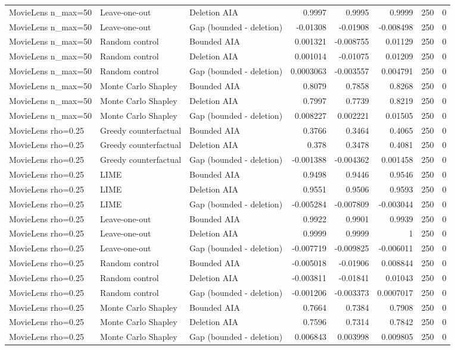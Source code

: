 \begin{table}[t]
{\begin{tabular}{lllrrrrr}
MovieLens n\_max=50 & Leave-one-out & Deletion AIA & 0.9997 & 0.9995 & 0.9999 & 250 & 0 \\
MovieLens n\_max=50 & Leave-one-out & Gap (bounded - deletion) & -0.01308 & -0.01908 & -0.008498 & 250 & 0 \\
MovieLens n\_max=50 & Random control & Bounded AIA & 0.001321 & -0.008755 & 0.01129 & 250 & 0 \\
MovieLens n\_max=50 & Random control & Deletion AIA & 0.001014 & -0.01075 & 0.01209 & 250 & 0 \\
MovieLens n\_max=50 & Random control & Gap (bounded - deletion) & 0.0003063 & -0.003557 & 0.004791 & 250 & 0 \\
MovieLens n\_max=50 & Monte Carlo Shapley & Bounded AIA & 0.8079 & 0.7858 & 0.8268 & 250 & 0 \\
MovieLens n\_max=50 & Monte Carlo Shapley & Deletion AIA & 0.7997 & 0.7739 & 0.8219 & 250 & 0 \\
MovieLens n\_max=50 & Monte Carlo Shapley & Gap (bounded - deletion) & 0.008227 & 0.002221 & 0.01505 & 250 & 0 \\
MovieLens rho=0.25 & Greedy counterfactual & Bounded AIA & 0.3766 & 0.3464 & 0.4065 & 250 & 0 \\
MovieLens rho=0.25 & Greedy counterfactual & Deletion AIA & 0.378 & 0.3478 & 0.4081 & 250 & 0 \\
MovieLens rho=0.25 & Greedy counterfactual & Gap (bounded - deletion) & -0.001388 & -0.004362 & 0.001458 & 250 & 0 \\
MovieLens rho=0.25 & LIME & Bounded AIA & 0.9498 & 0.9446 & 0.9546 & 250 & 0 \\
MovieLens rho=0.25 & LIME & Deletion AIA & 0.9551 & 0.9506 & 0.9593 & 250 & 0 \\
MovieLens rho=0.25 & LIME & Gap (bounded - deletion) & -0.005284 & -0.007809 & -0.003044 & 250 & 0 \\
MovieLens rho=0.25 & Leave-one-out & Bounded AIA & 0.9922 & 0.9901 & 0.9939 & 250 & 0 \\
MovieLens rho=0.25 & Leave-one-out & Deletion AIA & 0.9999 & 0.9999 & 1 & 250 & 0 \\
MovieLens rho=0.25 & Leave-one-out & Gap (bounded - deletion) & -0.007719 & -0.009825 & -0.006011 & 250 & 0 \\
MovieLens rho=0.25 & Random control & Bounded AIA & -0.005018 & -0.01906 & 0.008844 & 250 & 0 \\
MovieLens rho=0.25 & Random control & Deletion AIA & -0.003811 & -0.01841 & 0.01043 & 250 & 0 \\
MovieLens rho=0.25 & Random control & Gap (bounded - deletion) & -0.001206 & -0.003373 & 0.0007017 & 250 & 0 \\
MovieLens rho=0.25 & Monte Carlo Shapley & Bounded AIA & 0.7664 & 0.7384 & 0.7908 & 250 & 0 \\
MovieLens rho=0.25 & Monte Carlo Shapley & Deletion AIA & 0.7596 & 0.7314 & 0.7842 & 250 & 0 \\
MovieLens rho=0.25 & Monte Carlo Shapley & Gap (bounded - deletion) & 0.006843 & 0.003998 & 0.009805 & 250 & 0 \\
\bottomrule
\end{tabular}
}
\end{table}
